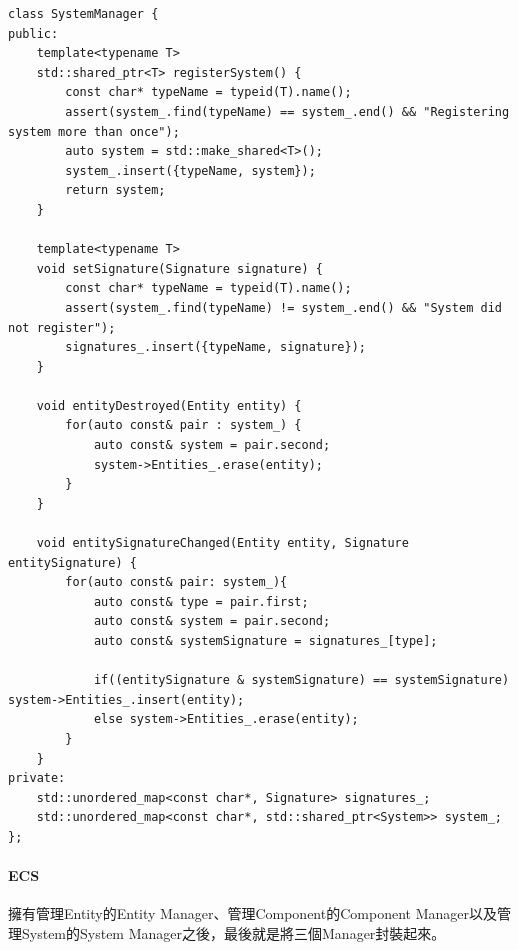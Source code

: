 \begin{lstlisting}
class SystemManager {
public:
    template<typename T>
    std::shared_ptr<T> registerSystem() {
        const char* typeName = typeid(T).name();
        assert(system_.find(typeName) == system_.end() && "Registering system more than once");
        auto system = std::make_shared<T>();
        system_.insert({typeName, system});
        return system;
    }

    template<typename T>
    void setSignature(Signature signature) {
        const char* typeName = typeid(T).name();
        assert(system_.find(typeName) != system_.end() && "System did not register");
        signatures_.insert({typeName, signature});
    }

    void entityDestroyed(Entity entity) {
        for(auto const& pair : system_) {
            auto const& system = pair.second;
            system->Entities_.erase(entity);
        }
    }

    void entitySignatureChanged(Entity entity, Signature entitySignature) {
        for(auto const& pair: system_){
            auto const& type = pair.first;
            auto const& system = pair.second;
            auto const& systemSignature = signatures_[type];

            if((entitySignature & systemSignature) == systemSignature) system->Entities_.insert(entity);
            else system->Entities_.erase(entity);
        }
    }
private:
    std::unordered_map<const char*, Signature> signatures_;
    std::unordered_map<const char*, std::shared_ptr<System>> system_; 
};
\end{lstlisting}

\paragraph{ECS}

擁有管理Entity的Entity Manager、管理Component的Component Manager以及管理System的System Manager之後，最後就是將三個Manager封裝起來。

